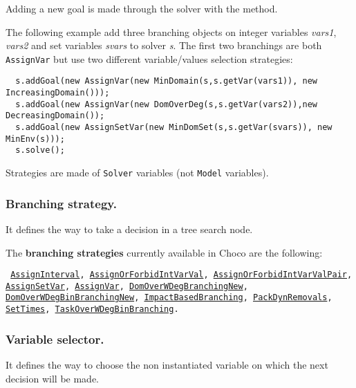 Adding a new goal is made through the solver with the  method. 

The following example add three branching objects on integer variables \emph{vars1}, \emph{vars2} and set variables \emph{svars} to solver \emph{s}. The first two branchings are both \texttt{AssignVar} but use two different variable/values selection strategies:
\begin{lstlisting}
  s.addGoal(new AssignVar(new MinDomain(s,s.getVar(vars1)), new IncreasingDomain()));
  s.addGoal(new AssignVar(new DomOverDeg(s,s.getVar(vars2)),new DecreasingDomain());
  s.addGoal(new AssignSetVar(new MinDomSet(s,s.getVar(svars)), new MinEnv(s)));
  s.solve();
\end{lstlisting}

\begin{note}
Strategies are made of \texttt{Solver} variables (not \texttt{Model} variables).
\end{note}

\subsubsection{Branching strategy.}\label{solver:branchstrat}\hypertarget{solver:branchstrat}{}
It defines the way to take a decision in a tree search node.
  
\noindent The \textbf{branching strategies} currently available in Choco are the following: 
\begin{notedef}\tt
\hyperlink{assigninterval:assignintervalbranchstrat}{AssignInterval}, \hyperlink{assignorforbidintvarval:assignorforbidintvarvalbranchstrat}{AssignOrForbidIntVarVal}, \hyperlink{assignorforbidintvarvalpair:assignorforbidintvarvalpairbranchstrat}{AssignOrForbidIntVarValPair}, \hyperlink{assignsetvar:assignsetvarbranchstrat}{AssignSetVar}, \hyperlink{assignvar:assignvarbranchstrat}{AssignVar}, \hyperlink{domoverwdeg:domoverwdegbranchstrat}{DomOverWDegBranchingNew}, \hyperlink{domoverwdegbin:domoverwdegbinbranchstrat}{DomOverWDegBinBranchingNew}, \hyperlink{impact:impactbranchstrat}{ImpactBasedBranching}, \hyperlink{packdynremovals:packdynremovalsbranchstrat}{PackDynRemovals}, \hyperlink{settimes:settimesbranchstrat}{SetTimes}, \hyperlink{taskdomoverwdeg:taskdomoverwdegbranchstrat}{TaskOverWDegBinBranching}.
\end{notedef}    


\subsubsection{Variable selector.}\label{solver:variableselector}\hypertarget{solver:variableselector}{}
It defines the way to choose the non instantiated variable on which the next decision will be made.

